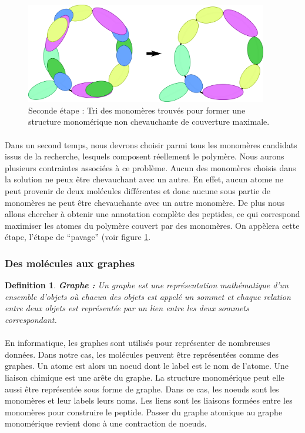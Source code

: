 \documentclass[12pt,french,twoside]{report}
\begin{document}
\begin{figure}[!h]
  \begin{center}
    \includegraphics[width=400px]{Figures/s2m/Intro/tiling.png}
    \caption{\label{tiling_fig}Seconde étape : Tri des monomères trouvés pour former une structure monomérique non chevauchante de couverture maximale.}
  \end{center}
\end{figure}

\paragraph{}Dans un second temps, nous devrons choisir parmi tous les monomères candidats issus de la recherche, lesquels composent réellement le polymère.
Nous aurons plusieurs contraintes associées à ce problème.
Aucun des monomères choisis dans la solution ne peux être chevauchant avec un autre.
En effet, aucun atome ne peut provenir de deux molécules différentes et donc aucune sous partie de monomères ne peut être chevauchante avec un autre monomère.
De plus nous allons chercher à obtenir une annotation complète des peptides, ce qui correspond maximiser les atomes du polymère couvert par des monomères.
On appèlera cette étape, l'étape de ``pavage'' (voir figure \ref{tiling_fig}.


\subsubsection{Des molécules aux graphes}

\newtheorem{definition}{Definition}
\begin{definition}\textbf{Graphe :}
 Un graphe est une représentation mathématique d'un ensemble d'objets où chacun des objets est appelé un sommet et
 chaque relation entre deux objets est représentée par un lien entre les deux sommets correspondant.
\end{definition}

\paragraph{}En informatique, les graphes sont utilisés pour représenter de nombreuses données.
Dans notre cas, les molécules peuvent être représentées comme des graphes.
Un atome est alors un noeud dont le label est le nom de l'atome.
Une liaison chimique est une arête du graphe.
La structure monomérique peut elle aussi être représentée sous forme de graphe.
Dans ce cas, les noeuds sont les monomères et leur labels leurs noms.
Les liens sont les liaisons formées entre les monomères pour construire le peptide.
Passer du graphe atomique au graphe monomérique revient donc à une contraction de noeuds.
\end{document}
